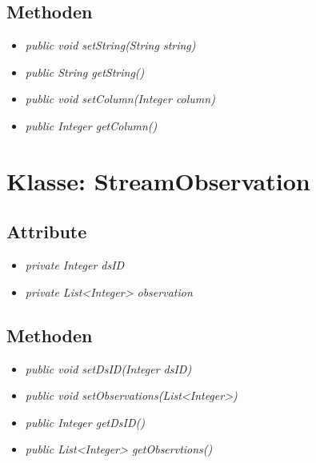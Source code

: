 \subsection{Methoden}
\begin{itemize}
	\item \textit{public void setString(String string)}
	\item \textit{public String getString()}
	
	\item \textit{public void setColumn(Integer column)}
	\item \textit{public Integer getColumn()}
\end{itemize}

\section{Klasse: StreamObservation}
\subsection{Attribute} 
\begin{itemize}
	\item \textit{private Integer dsID}
	\item \textit{private List<Integer> observation}
\end{itemize}

\subsection{Methoden}
\begin{itemize}
	\item \textit{public void setDsID(Integer dsID)}
	\item \textit{public void setObservations(List<Integer>)}
	\item \textit{public Integer getDsID()}
	\item \textit{public List<Integer> getObservtions()}
\end{itemize}

